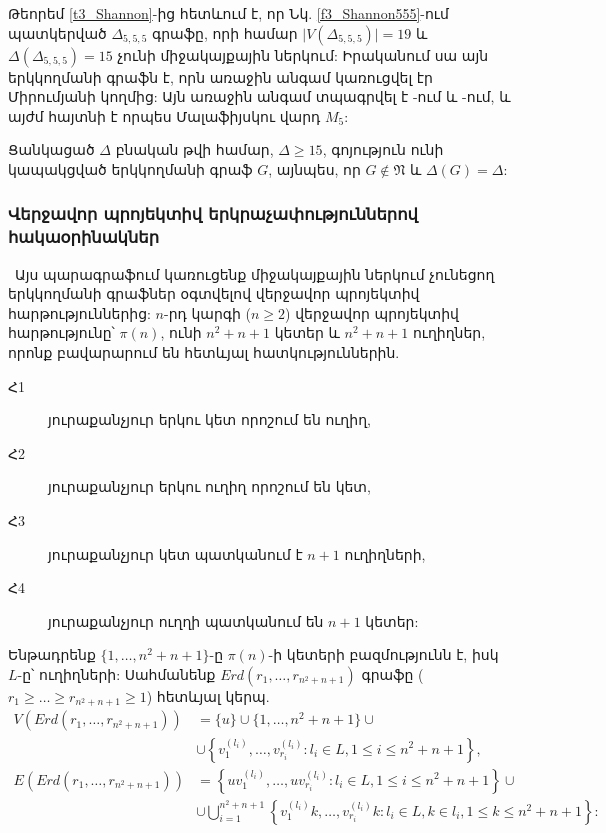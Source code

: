 Թեորեմ \ref{t3_Shannon}-ից հետևում է, որ Նկ. \ref{f3_Shannon555}-ում պատկերված $\Delta_{5,5,5}$
գրաֆը, որի համար $\vert V(\Delta_{5,5,5})\vert=19$ և
$\Delta(\Delta_{5,5,5})=15$ չունի միջակայքային ներկում: Իրականում սա այն երկկողմանի գրաֆն է, որն առաջին անգամ կառուցվել էր Միրումյանի կողմից: Այն առաջին անգամ տպագրվել է \cite{AsratianDenleyHaggvist1998}-ում և \cite{GiaroKubaleMalafiejski1999}-ում,
և այժմ հայտնի է որպես Մալաֆիյսկու վարդ $M_{5}$:

\begin{corollary}
\label{c3_Shannon} Ցանկացած $\Delta$ բնական թվի համար, $\Delta \geq 15$,
գոյություն ունի կապակցված երկկողմանի գրաֆ $G$, այնպես, որ $G\notin \mathfrak{N}$
և $\Delta(G)=\Delta$:
\end{corollary}

\subsubsection{Վերջավոր պրոյեկտիվ երկրաչափություններով հակաօրինակներ}\
Այս պարագրաֆում կառուցենք միջակայքային ներկում չունեցող երկկողմանի գրաֆներ օգտվելով վերջավոր պրոյեկտիվ հարթություններից: $n$-րդ կարգի ($n\geq 2$) վերջավոր պրոյեկտիվ հարթությունը՝ $\pi(n)$, ունի $n^{2}+n+1$ կետեր և $n^{2}+n+1$ ուղիղներ, որոնք բավարարում են հետևյալ հատկություններին.

\begin{description}
\item[Հ1] յուրաքանչյուր երկու կետ որոշում են ուղիղ,

\item[Հ2] յուրաքանչյուր երկու ուղիղ որոշում են կետ,

\item[Հ3] յուրաքանչյուր կետ պատկանում է $n+1$ ուղիղների,

\item[Հ4] յուրաքանչյուր ուղղի պատկանում են $n+1$ կետեր:
\end{description}

Ենթադրենք $\{1,\ldots,n^{2}+n+1\}$-ը $\pi(n)$-ի կետերի բազմությունն է, իսկ $L$-ը՝ ուղիղների:
Սահմանենք $Erd(r_{1},\ldots,r_{n^{2}+n+1})$ գրաֆը ($r_{1}\geq \ldots\geq
r_{n^{2}+n+1}\geq 1$) հետևյալ կերպ.
\begin{align*}
V(Erd(r_{1},\ldots,r_{n^{2}+n+1})) &= \{u\}\cup\{1,\ldots,n^{2}+n+1\} \cup\\
&\cup \left\{v^{(l_{i})}_{1},\ldots,v^{(l_{i})}_{r_{i}}:l_{i}\in L,1\leq i\leq n^{2}+n+1\right\},\\
E(Erd(r_{1},\ldots,r_{n^{2}+n+1})) &= \left\{uv^{(l_{i})}_{1},\ldots,uv^{(l_{i})}_{r_{i}}:l_{i}\in L, 1\leq i\leq
n^{2}+n+1\right\}\cup \\
&\cup \bigcup_{i=1}^{n^{2}+n+1}\left\{v^{(l_{i})}_{1}k,\ldots,v^{(l_{i})}_{r_{i}}k:l_{i}\in L, k\in l_{i},1\leq k\leq n^{2}+n+1\right\}:
\end{align*}

